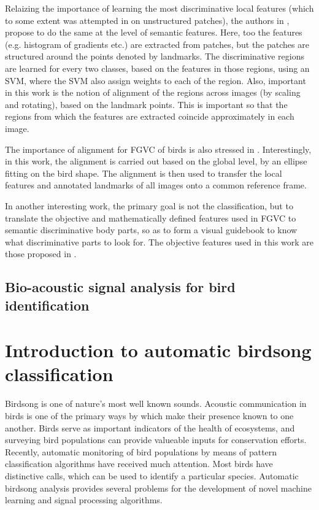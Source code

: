 \documentclass{article}
\begin{document}
Relaizing the importance of learning the most discriminative local features (which to some extent was attempted in \cite{} on unstructured patches), the authors in \cite{}, propose to do the same at the level of semantic features. Here, too the features (e.g. histogram of gradients etc.) are extracted from patches, but the patches are structured around the points denoted by landmarks. The discriminative regions are learned for every two classes, based on the features in those regions, using an SVM, where the SVM also assign weights to each of the region. Also, important in this work is the notion of alignment of the regions across images (by scaling and rotating), based on the landmark points. This is important so that the regions from which the features are extracted coincide approximately in each image. 

The importance of alignment for FGVC of birds is also stressed in \cite{}. Interestingly, in this work, the alignment is carried out based on the global level, by an ellipse fitting on the bird shape. The alignment is then used to transfer the local features and annotated landmarks of all images onto a common reference frame.  

In another interesting work, the primary goal is not the classification, but to translate the objective and mathematically defined features used in FGVC to semantic discriminative body parts, so as to form a visual guidebook to know what discriminative parts to look for. The objective features used in this work are those proposed in \cite{}.
 
\subsection{Bio-acoustic signal analysis for bird identification}

\section*{Introduction to automatic birdsong classification}

Birdsong is one of nature's most well known sounds. Acoustic communication in
birds is one of the primary ways by which make their presence known to one
another. Birds serve as important indicators of the health of ecosystems, and
surveying bird populations can provide valueable inputs for conservation efforts.
Recently, automatic monitoring of bird populations by means of pattern
classification algorithms have received much attention. Most birds have
distinctive calls, which can be used to identify a particular species. Automatic
birdsong analysis provides several problems for the development of novel machine learning
and signal processing algorithms.
\end{document}
